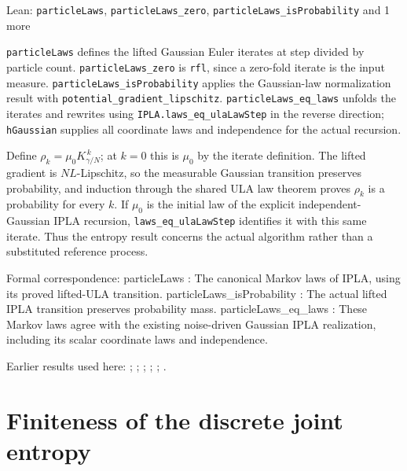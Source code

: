 \documentclass[11pt,a4paper]{article}
\newcommand{\leanlabel}[1]{\par\smallskip\noindent{\small\bfseries #1}\par}
\begin{document}
\begin{leanbox}{Lean: \texttt{particleLaws}, \texttt{particleLaws\_\allowbreak{}zero}, \texttt{particleLaws\_\allowbreak{}isProbability} and 1 more}
\leanlabel{How the Lean proof follows the argument}
\texttt{particle\allowbreak{}Laws} defines the lifted Gaussian Euler iterates at step divided by particle count. \texttt{particle\allowbreak{}Laws\_\allowbreak{}zero} is \texttt{rfl}, since a zero-fold iterate is the input measure. \texttt{particle\allowbreak{}Laws\_\allowbreak{}is\allowbreak{}Probability} applies the Gaussian-law normalization result with \texttt{potential\_\allowbreak{}gradient\_\allowbreak{}lipschitz}. \texttt{particle\allowbreak{}Laws\_\allowbreak{}eq\_\allowbreak{}laws} unfolds the iterates and rewrites using \texttt{IPLA.\allowbreak{}laws\_\allowbreak{}eq\_\allowbreak{}ula\allowbreak{}Law\allowbreak{}Step} in the reverse direction; \texttt{h\allowbreak{}Gaussian} supplies all coordinate laws and independence for the actual recursion.



Define \(\rho_k=\mu_0K_{\gamma/N}^{\,k}\); at \(k=0\) this is \(\mu_0\) by the iterate definition. The lifted gradient is \(NL\)-Lipschitz, so the measurable Gaussian transition preserves probability, and induction through the shared ULA law theorem proves \(\rho_k\) is a probability for every \(k\). If \(\mu_0\) is the initial law of the explicit independent-Gaussian IPLA recursion, \texttt{laws\_\allowbreak{}eq\_\allowbreak{}ula\allowbreak{}Law\allowbreak{}Step} identifies it with this same iterate. Thus the entropy result concerns the actual algorithm rather than a substituted reference process.



Formal correspondence: particleLaws : The canonical Markov laws of IPLA, using its proved lifted-ULA transition. particleLaws\_isProbability : The actual lifted IPLA transition preserves probability mass. particleLaws\_eq\_laws : These Markov laws agree with the existing noise-driven Gaussian IPLA realization, including its scalar coordinate laws and independence.
\end{leanbox}


Earlier results used here: \cite[Section~3.8.2]{LangevinLean2026ULALSI}; \cite[Section~3.8.8]{LangevinLean2026ULALSI}; \cite[Section~3.1.1]{LangevinLean2026IPLA}; \cite[Section~3.1.4]{LangevinLean2026IPLA}; \cite[Section~3.16.3]{LangevinLean2026IPLA}; \cite[Section~3.3.2]{LangevinLean2026IPLA}.

\section{\texorpdfstring{Finiteness of the discrete joint entropy}{Finiteness of the discrete joint entropy}}
\end{document}
